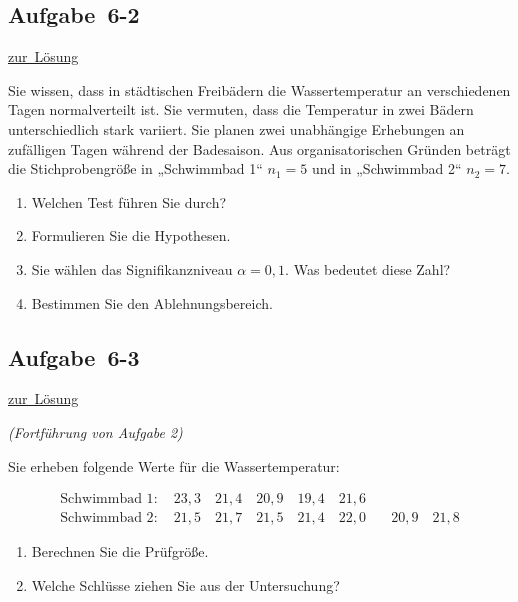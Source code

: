 \documentclass[
  11pt,
  ngerman,
  a4paper,
]{report}
\providecommand{\tightlist}{%
  \setlength{\itemsep}{0pt}\setlength{\parskip}{0pt}}
\begin{document}
\hypertarget{aufgabe-6-2}{%
\subsection{Aufgabe~6-2}\label{aufgabe-6-2}}

\protect\hyperlink{loesung-6-2}{zur~Lösung}

Sie wissen, dass in städtischen Freibädern die Wassertemperatur an verschiedenen Tagen normalverteilt ist. Sie vermuten, dass die Temperatur in zwei Bädern unterschiedlich stark variiert. Sie planen zwei unabhängige Erhebungen an zufälligen Tagen während der Badesaison. Aus organisatorischen Gründen beträgt die Stichprobengröße in „Schwimmbad 1`` \(n_1=5\) und in „Schwimmbad 2`` \(n_2=7\).

\begin{enumerate}
\def\labelenumi{\alph{enumi})}
\tightlist
\item
  Welchen Test führen Sie durch?
\item
  Formulieren Sie die Hypothesen.
\item
  Sie wählen das Signifikanzniveau \(\alpha=0{,}1\). Was bedeutet diese Zahl?
\item
  Bestimmen Sie den Ablehnungsbereich.
\end{enumerate}

\hypertarget{aufgabe-6-3}{%
\subsection{Aufgabe~6-3}\label{aufgabe-6-3}}

\protect\hyperlink{loesung-6-3}{zur~Lösung}

\emph{(Fortführung von Aufgabe 2)}

Sie erheben folgende Werte für die Wassertemperatur:

\[\begin{aligned}
\textrm{Schwimmbad 1}:\quad 23{,}3\quad21{,}4\quad20{,}9\quad19{,}4\quad21{,}6&\\
\textrm{Schwimmbad 2} : \quad 21{,}5\quad21{,}7\quad21{,}5\quad21{,}4\quad22{,}0&\quad20{,}9\quad21{,}8
\end{aligned}\]

\begin{enumerate}
\def\labelenumi{\alph{enumi})}
\tightlist
\item
  Berechnen Sie die Prüfgröße.
\item
  Welche Schlüsse ziehen Sie aus der Untersuchung?
\end{enumerate}
\end{document}
